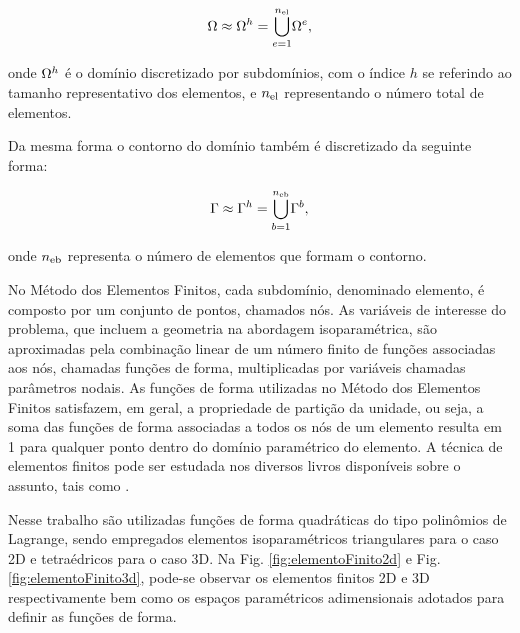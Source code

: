 \documentclass[tese_patricia]{subfiles}%
\begin{document}
\begin{align}
	\Omega \approx \Omega^h = {\bigcup_{e = 1}^{n_{\mathrm{el}}}} \Omega^e,
\end{align}

\noindent onde $\Omega^h$ é o domínio discretizado por subdomínios, com o índice $h$ se referindo ao tamanho representativo dos elementos, e $n_{\mathrm{el}}$ representando o número total de elementos.

Da mesma forma o contorno do domínio também é discretizado da seguinte forma:

\begin{align}
	\Gamma \approx \Gamma^h = {\bigcup_{b = 1}^{n_{\mathrm{eb}}}} \Gamma^{b},
\end{align}

\noindent onde $n_{\mathrm{eb}}$ representa o número de elementos que formam o contorno.

No Método dos Elementos Finitos, cada subdomínio, denominado elemento, é composto por um conjunto de pontos, chamados nós. As variáveis de interesse do problema, que incluem a geometria na abordagem isoparamétrica, são aproximadas pela combinação linear de um número finito de funções associadas aos nós, chamadas funções de forma, multiplicadas por variáveis chamadas parâmetros nodais. As funções de forma utilizadas no Método dos Elementos Finitos satisfazem, em geral, a propriedade de partição da unidade, ou seja, a soma das funções de forma associadas a todos os nós de um elemento resulta em 1 para qualquer ponto dentro do domínio paramétrico do elemento. A técnica de elementos finitos pode ser estudada nos diversos livros disponíveis sobre o assunto, tais como .

Nesse trabalho são utilizadas funções de forma quadráticas do tipo polinômios de Lagrange, sendo empregados elementos isoparamétricos triangulares para o caso 2D e tetraédricos para o caso 3D. Na Fig. \ref{fig:elementoFinito2d} e Fig. \ref{fig:elementoFinito3d}, pode-se observar os elementos finitos 2D e 3D respectivamente bem como os espaços paramétricos adimensionais adotados para definir as funções de forma. 
\end{document}
